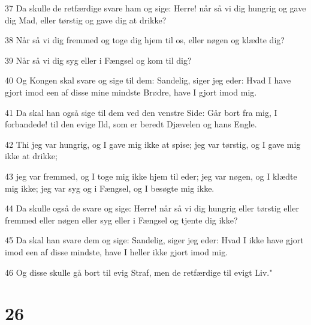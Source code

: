 \par 37 Da skulle de retfærdige svare ham og sige: Herre! når så vi dig hungrig og gave dig Mad, eller tørstig og gave dig at drikke?
\par 38 Når så vi dig fremmed og toge dig hjem til os, eller nøgen og klædte dig?
\par 39 Når så vi dig syg eller i Fængsel og kom til dig?
\par 40 Og Kongen skal svare og sige til dem: Sandelig, siger jeg eder: Hvad I have gjort imod een af disse mine mindste Brødre, have I gjort imod mig.
\par 41 Da skal han også sige til dem ved den venstre Side: Går bort fra mig, I forbandede! til den evige Ild, som er beredt Djævelen og hans Engle.
\par 42 Thi jeg var hungrig, og I gave mig ikke at spise; jeg var tørstig, og I gave mig ikke at drikke;
\par 43 jeg var fremmed, og I toge mig ikke hjem til eder; jeg var nøgen, og I klædte mig ikke; jeg var syg og i Fængsel, og I besøgte mig ikke.
\par 44 Da skulle også de svare og sige: Herre! når så vi dig hungrig eller tørstig eller fremmed eller nøgen eller syg eller i Fængsel og tjente dig ikke?
\par 45 Da skal han svare dem og sige: Sandelig, siger jeg eder: Hvad I ikke have gjort imod een af disse mindste, have I heller ikke gjort imod mig.
\par 46 Og disse skulle gå bort til evig Straf, men de retfærdige til evigt Liv."

\chapter{26}

